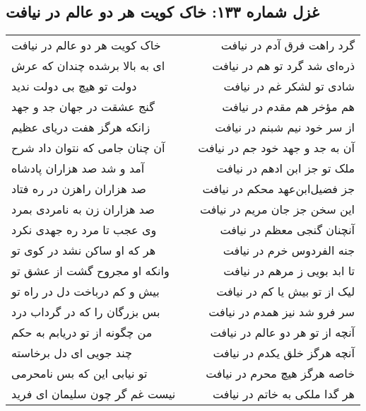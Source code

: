 \begin{center}
\section*{غزل شماره ۱۳۳: خاک کویت هر دو عالم در نیافت}
\label{sec:133}
\begin{longtable}{l p{0.5cm} r}
خاک کویت هر دو عالم در نیافت
&&
گرد راهت فرق آدم در نیافت
\\
ای به بالا برشده چندان که عرش
&&
ذره‌ای شد گرد تو هم در نیافت
\\
دولت تو هیچ بی دولت ندید
&&
شادی تو لشکر غم در نیافت
\\
گنج عشقت در جهان جد و جهد
&&
هم مؤخر هم مقدم در نیافت
\\
زانکه هرگز هفت دریای عظیم
&&
از سر خود نیم شبنم در نیافت
\\
آن چنان جامی که نتوان داد شرح
&&
آن به جد و جهد خود جم در نیافت
\\
آمد و شد صد هزاران پادشاه
&&
ملک تو جز ابن ادهم در نیافت
\\
صد هزاران راهزن در ره فتاد
&&
جز فضیل‌ابن‌عهد محکم در نیافت
\\
صد هزاران زن به نامردی بمرد
&&
این سخن جز جان مریم در نیافت
\\
وی عجب تا مرد ره جهدی نکرد
&&
آنچنان گنجی معظم در نیافت
\\
هر که او ساکن نشد در کوی تو
&&
جنه الفردوس خرم در نیافت
\\
وانکه او مجروح گشت از عشق تو
&&
تا ابد بویی ز مرهم در نیافت
\\
بیش و کم درباخت دل در راه تو
&&
لیک از تو بیش یا کم در نیافت
\\
بس بزرگان را که در گرداب درد
&&
سر فرو شد نیز همدم در نیافت
\\
من چگونه از تو دریابم به حکم
&&
آنچه از تو هر دو عالم در نیافت
\\
چند جویی ای دل برخاسته
&&
آنچه هرگز خلق یکدم در نیافت
\\
تو نیابی این که بس نامحرمی
&&
خاصه هرگز هیچ محرم در نیافت
\\
نیست غم گر چون سلیمان ای فرید
&&
هر گدا ملکی به خاتم در نیافت
\\
\end{longtable}
\end{center}

